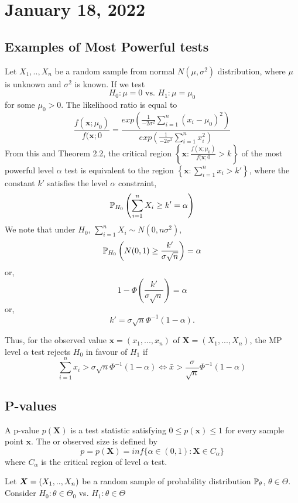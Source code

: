 \section{January 18, 2022}
\subsection{Examples of Most Powerful tests}
\begin{example}
Let $X_1,..,X_n$ be a random sample from normal $N(\mu, \sigma^2)$ distribution, where $\mu$ is unknown and $\sigma^2$ is known. If we test
$$
H_0: \mu = 0  \text{ vs. } H_1:\mu = \mu_0
$$ for some $\mu_0>0$. The likelihood ratio is equal to 
$$
\frac{f(\boldsymbol{x};\mu_0)}{f(\boldsymbol{x};0} = \frac{exp(\frac{1}{-2 \sigma^2}\sum_{i=1}^{n}(x_i - \mu_0)^2)}{exp(\frac{1}{-2\sigma^2}\sum_{i=1}^{n}x_i^{2})}
$$
From this and Theorem 2.2, the critical region 
$ \left\{ 
\boldsymbol{x}: \frac{f(\boldsymbol{x};\mu_0)}{f(\boldsymbol{x};0} > k
\right \}$ of the most powerful level $\alpha$ test is equivalent to the region 
$ \left\{ 
\boldsymbol{x}: \sum_{i=1}^{n}x_i > k'
\right \}$,
where the constant $k'$ satisfies the level $\alpha$ constraint,
$$
\mathbb P_{H_0} \left( 
\sum_{i=1}^{n}X_i \geq k' = \alpha
\right)
$$
We note that under $H_0$, $\sum_{i=1}^{n}X_i \sim N(0,n\sigma^2)$,
$$
\mathbb P_{H_0} \left(
N(0,1) \geq \frac{k'}{\sigma \sqrt{n}}
\right) = \alpha
$$
or,
$$
1 - \Phi \left( \frac{k'}{\sigma \sqrt{n}} \right ) = \alpha
$$
or,
$$
k' = \sigma \sqrt{n}\Phi^{-1}(1-\alpha).$$ 

Thus, for the observed value
$\boldsymbol{x} = (x_1,...,x_n)$ of $\boldsymbol{X} = (X_1,...,X_n)$, the MP level $\alpha$ test rejects $H_0$ in favour of $H_1$ if 
$$
\sum_{i=1}^{n}x_i > \sigma \sqrt{n} \Phi^{-1}(1- \alpha) \iff  \bar{x} > \frac \sigma{\sqrt{n}}\Phi^{-1}(1-\alpha)
$$

\end{example}
\subsection{P-values}

\begin{definition}[p-value]
A p-value $p(\boldsymbol{X})$ is a test statistic satisfying $0 \leq p(\boldsymbol{x}) \leq 1$ for every sample point $\boldsymbol{x}$.  
The  or observed size is defined by
$$
p = p(\boldsymbol{X}) = inf \{ \alpha \in (0,1): \boldsymbol{X} \in C_{\alpha} \}
$$
where $C_{\alpha}$ is the critical region of level $\alpha$ test.
\end{definition}

\begin{lemma}
Let $\boldsymbol{X} = (X_1,..,X_n)$ be a random sample of probability distribution $\mathbb P_{\theta}$, $\theta \in \Theta$. Consider $H_0: \theta \in \Theta_{0}$ vs. $H_1: \theta \in \Theta$
\end{lemma}

